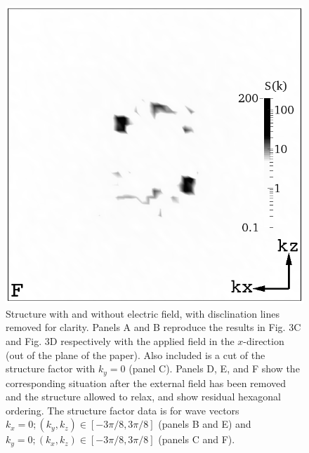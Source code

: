 \documentclass[12pt,twoside]{article}
\begin{document}
\begin{figure}[!h]
\begin{center}
\includegraphics[width=0.32\columnwidth]{sq_y_run1342.png}
\end{center}
\caption{Structure with and without electric field, with disclination lines
removed for clarity. Panels A and B reproduce the results in Fig. 3C and
Fig. 3D respectively with the applied field in the $x$-direction 
(out of the plane of the paper). Also included is a cut of the structure 
factor with $k_y = 0$ (panel C). 
Panels D, E, and F show the corresponding situation after the
external field has been removed and the structure allowed to relax,
and show residual hexagonal ordering. The structure factor data is for wave
vectors $k_x = 0; (k_y, k_z) \in [-3\pi/8 , 3\pi/8]$ (panels B and E) and
$k_y = 0; (k_x, k_z) \in [-3\pi/8, 3\pi/8]$ (panels C and F).}
\end{figure}

\newpage
\end{document}
